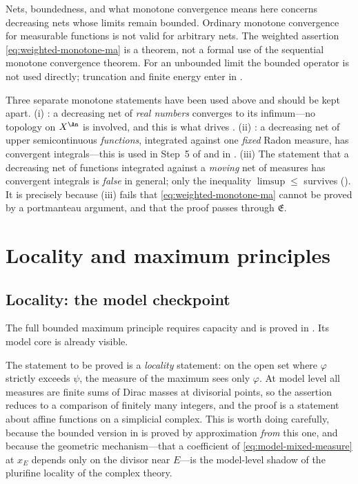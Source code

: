 \begin{warning}{Nets, boundedness, and what monotone convergence means here}
 concerns decreasing nets whose limits
remain bounded. Ordinary monotone convergence for measurable functions is
not valid for arbitrary nets. The weighted assertion
\eqref{eq:weighted-monotone-ma} is a theorem, not a formal use of the
sequential monotone convergence theorem. For an unbounded limit the bounded
operator is not used directly; truncation and finite energy enter in
.

Three separate monotone statements have been used above and should be kept
apart.  (i) : a decreasing net of
\emph{real numbers} converges to its infimum---no topology on \(X^{\An}\) is
involved, and this is what drives
.  (ii)
: a decreasing net of upper
semicontinuous \emph{functions}, integrated against one \emph{fixed} Radon
measure, has convergent integrals---this is used in Step~5 of
 and in
.  (iii) The statement that a
decreasing net of functions integrated against a \emph{moving} net of
measures has convergent integrals is \emph{false} in general; only the
inequality \(\limsup\leq\) survives
().  It is precisely because (iii) fails
that \eqref{eq:weighted-monotone-ma} cannot be proved by a portmanteau
argument, and that the proof passes through \(\mathfrak E\).
\end{warning}

\section{Locality and maximum principles}
\label{sec:ch24-locality}

\subsection{Locality: the model checkpoint}
\label{sec:ch24-model-locality}

The full bounded maximum principle requires capacity and is proved in
. Its model core is already
visible.

The statement to be proved is a \emph{locality} statement: on the open set
where \(\varphi\) strictly exceeds \(\psi\), the measure of the maximum sees
only \(\varphi\).  At model level all measures are finite sums of Dirac
masses at divisorial points, so the assertion reduces to a comparison of
finitely many integers, and the proof is a statement about affine functions
on a simplicial complex.  This is worth doing carefully, because the bounded
version in  is proved by approximation \emph{from}
this one, and because the geometric mechanism---that a coefficient of
\eqref{eq:model-mixed-measure} at \(x_E\) depends only on the divisor near
\(E\)---is the model-level shadow of the plurifine locality of the complex
theory.

